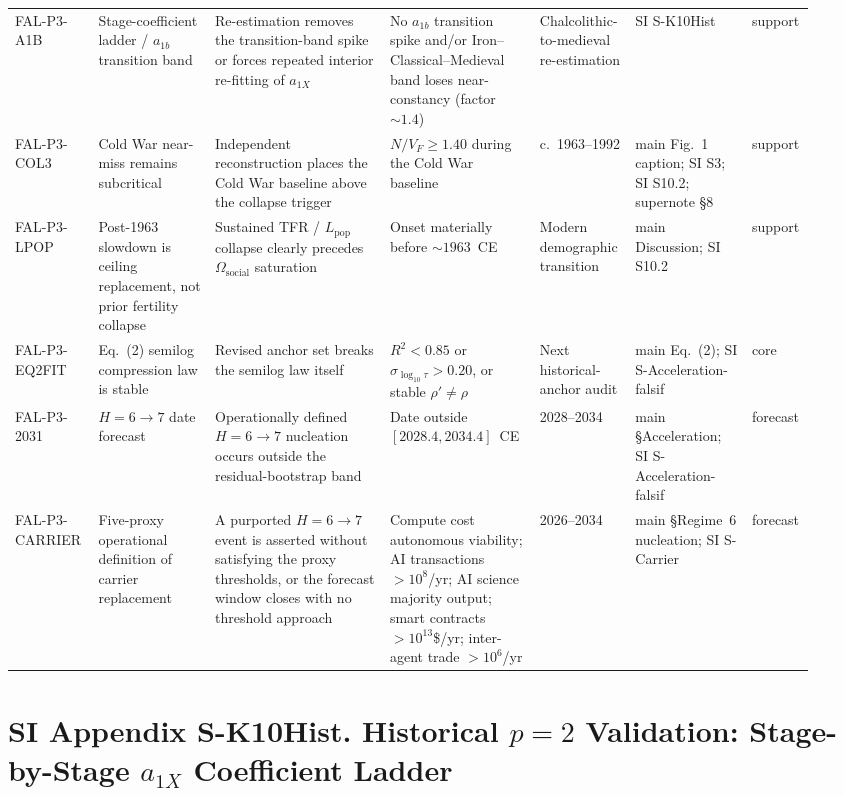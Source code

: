 \documentclass[11pt]{article}
\begin{document}
\begin{table}[t]
\begin{tabular}{p{0.10\linewidth}p{0.14\linewidth}p{0.21\linewidth}%
                p{0.18\linewidth}p{0.11\linewidth}p{0.14\linewidth}p{0.05\linewidth}}
FAL-P3-A1B & Stage-coefficient ladder / $a_{1b}$ transition band & Re-estimation removes the transition-band spike or forces repeated interior re-fitting of $a_{1X}$ & No $a_{1b}$ transition spike and/or Iron--Classical--Medieval band loses near-constancy (factor $\sim 1.4$) & Chalcolithic-to-medieval re-estimation & SI S-K10Hist & support \\
FAL-P3-COL3 & Cold War near-miss remains subcritical & Independent reconstruction places the Cold War baseline above the collapse trigger & $N/V_F\ge 1.40$ during the Cold War baseline & c.\ 1963--1992 & main Fig.~1 caption; SI S3; SI S10.2; supernote \S8 & support \\
FAL-P3-LPOP & Post-1963 slowdown is ceiling replacement, not prior fertility collapse & Sustained TFR / $L_{\mathrm{pop}}$ collapse clearly precedes $\Omega_{\mathrm{social}}$ saturation & Onset materially before $\sim 1963$~CE & Modern demographic transition & main Discussion; SI S10.2 & support \\
FAL-P3-EQ2FIT & Eq.~(2) semilog compression law is stable & Revised anchor set breaks the semilog law itself & $R^2<0.85$ or $\sigma_{\log_{10}\tau}>0.20$, or stable $\rho'\neq \rho$ & Next historical-anchor audit & main Eq.~(2); SI S-Acceleration-falsif & core \\
FAL-P3-2031 & $H=6\to 7$ date forecast & Operationally defined $H=6\to 7$ nucleation occurs outside the residual-bootstrap band & Date outside $[2028.4,2034.4]$~CE & 2028--2034 & main \S Acceleration; SI S-Acceleration-falsif & forecast \\
FAL-P3-CARRIER & Five-proxy operational definition of carrier replacement & A purported $H=6\to 7$ event is asserted without satisfying the proxy thresholds, or the forecast window closes with no threshold approach & Compute cost autonomous viability; AI transactions $>10^8$/yr; AI science majority output; smart contracts $>10^{13}$\$/yr; inter-agent trade $>10^6$/yr & 2026--2034 & main \S Regime~6 nucleation; SI S-Carrier & forecast \\
\bottomrule
\end{tabular}
\end{table}



\section*{SI Appendix S-K10Hist. Historical $p=2$ Validation: Stage-by-Stage $a_{1X}$ Coefficient Ladder}\label{sec:S-K10Hist}
\end{document}
